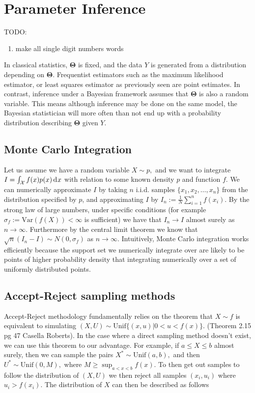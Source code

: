 \chapter{Parameter Inference}

TODO: \begin{enumerate}
    \item make all single digit numbers words
\end{enumerate}

In classical statistics, $\mathbf\Theta$ is fixed, and the data $Y$ is 
generated from a distribution depending on $\mathbf\Theta$. Frequentist 
estimators such as the maximum likelihood estimator, or least squares estimator 
as previously seen are point estimates. In contrast, inference under a Bayesian 
framework assumes that $\mathbf\Theta$ is also a random variable. This means 
although inference may be done on the same model, the Bayesian statistician 
will more often than not end up with a probability distribution describing 
$\mathbf\Theta$ given $Y$.

\color{red}
\section{Monte Carlo Integration}

Let us assume we have a random variable $X\sim p,$ and we want to integrate $I = \int_{\mathcal{X}} f(x)p(x)\diff x$ with relation to some known density $p$ and function $f$. We can numerically approximate $I$ by taking $n$ i.i.d. samples $\{x_1, x_2, \dots, x_n\}$ from the distribution specified by $p$, and approximating $I$ by $I_n:=\frac{1}{N}\sum_{i = 1}^nf(x_i).$ By the strong law of large numbers, under specific conditions (for example $\sigma_f := \mathrm{Var}(f(X))<\infty$ is sufficient) we have that $I_n \to I$ almost surely as $n\to\infty$. Furthermore by the central limit theorem we know that $\sqrt{n}(I_n - I) \sim N(0, \sigma_f)$ as $n\to\infty.$ Intuitively, Monte Carlo integration works efficiently because the support set we numerically integrate over are likely to be points of higher probability density that integrating numerically over a set of uniformly distributed points.

\color{black}
\section{Accept-Reject sampling methods}

Accept-Reject methodology fundamentally relies on the theorem that $X\sim f $ is equivalent to simulating $(X,U) \sim \mathrm{Unif}\{(x, u)|0<u<f(x)\}.$ (Theorem 2.15 pg 47 Casella Roberts). In the case where a direct sampling method doesn't exist, we can use this theorem to our advantage. For example, if $a \leq X \leq b$ almost surely, then we can sample the pairs $X^*\sim \mathrm{Unif}(a, b),$ and then $U^*\sim\mathrm{Unif}(0, M),$ where $M\geq \sup_{a<x<b} f(x).$ To then get out samples to follow the distribution of $(X, U)$ we then reject all samples $(x_i, u_i)$ where $u_i>f(x_i).$ The distribution of $X$ can then be described as follows

